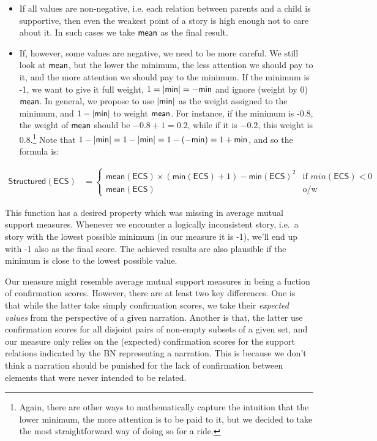 \documentclass[10pt,]{scrartcl}
\newcommand{\s}[1]{\mbox{\textsf{#1}}}
\begin{document}
\begin{itemize}
\item  If all values are non-negative, i.e. each relation between parents and a child is supportive, then even the weakest point of a story is high enough not to care about it. In such cases we take $\s{mean}$ as the final result.

\item If, however, some values are negative, we need to be more careful. We still look at  $\s{mean}$, but  the lower the minimum, the less attention we should pay to it, and the more attention we should pay to the minimum. If the minimum is -1, we want to give it full weight, $1 = \vert \s{min}\vert = - \s{min}$ and ignore (weight by 0) $\s{mean}$. In general, we propose to use $\vert \s{min}\vert$  as the weight assigned to the minimum, and  $1-\vert \s{min}\vert$  to weight $\s{mean}$.  For instance, if the minimum is -0.8, the weight of  $\s{mean}$ should be $-0.8+1 = 0.2$, while if it is $-0.2$, this weight is $0.8$.\footnote{Again, there are other ways to mathematically capture the intuition that the lower minimum, the more attention is to be paid to it, but we decided to take the most straightforward way of doing so for a ride.}  Note that  $1-\vert \s{min}\vert =  1-\vert \s{min}\vert = 1 - (- \s{min}) = 1+\s{min}$, and so the  formula is:
\end{itemize}

\footnotesize

\begin{align*}
\mathsf{Structured}(\mathsf{ECS}) & = \begin{cases}
\mathsf{mean}(\mathsf{ECS})  \times \left(\textsf{min}(\mathsf{ECS})+1 \right) - \textsf{min}(\mathsf{ECS})^2   & \text{if } min(\mathsf{ECS})<0 \\\mathsf{mean}(\mathsf{ECS}) & \text{o/w}
\end{cases}
\end{align*}

\normalsize





This function has a desired property which was missing in average mutual support measures. Whenever we encounter a logically inconsistent
story, i.e.~a story with the lowest possible minimum (in our measure it
is -1), we'll end up with -1 also as the final score. The achieved
results are also plausible if the minimum is close to the lowest
possible value.


Our measure might resemble average mutual support measures in being a fuction of confirmation scores. However, there are at least two key differences.
One is that while the latter  take simply confirmation scores, we take their \emph{expected values} from the perspective of a given narration. Another is that, the latter use confirmation scores for all disjoint pairs of non-empty subsets of a given set, and our measure only relies on the
(expected) confirmation scores for the support relations indicated by the BN
representing a narration. This is because we don't think a narration
should be punished for the lack of confirmation between elements that
were never intended to be related. 
\end{document}
